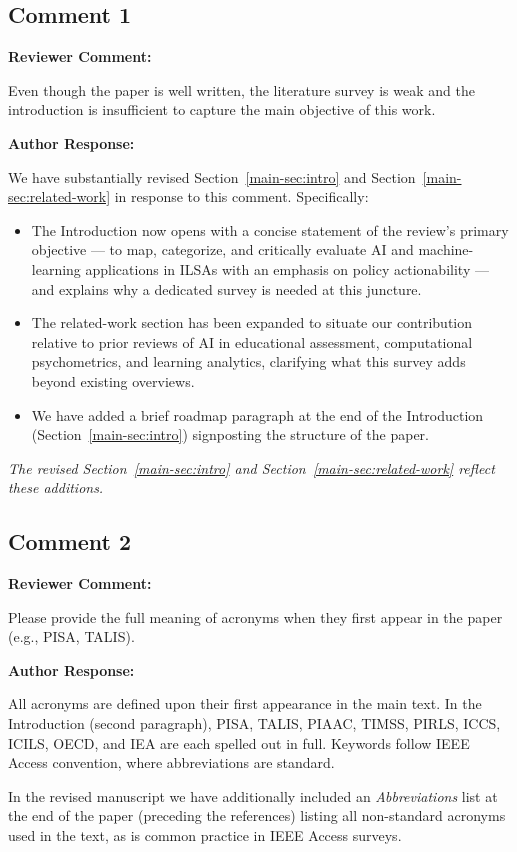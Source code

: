 \documentclass[12pt, a4paper]{article}
\newcommand{\R}[1]{Section~\ref{main-#1}}
\newenvironment{reviewercomment}{%
  \begin{mdframed}[linecolor=reviewercolor, linewidth=1.5pt,
    backgroundcolor=reviewercolor!6, innertopmargin=8pt, innerbottommargin=8pt]
  \color{reviewercolor}\textbf{Reviewer Comment:}\normalcolor\par\smallskip
}{%
  \end{mdframed}\medskip
}
\newenvironment{authorresponse}{%
  \begin{mdframed}[linecolor=authorcolor, linewidth=1pt,
    backgroundcolor=authorcolor!5, innertopmargin=8pt, innerbottommargin=8pt]
  \color{authorcolor}\textbf{Author Response:}\normalcolor\par\smallskip
}{%
  \end{mdframed}\bigskip
}
\newcommand{\changed}[1]{\textcolor{changedcolor}{\textit{#1}}}
\begin{document}
\subsection*{Comment 1}

\begin{reviewercomment}
Even though the paper is well written, the literature survey is weak and
the introduction is insufficient to capture the main objective of this work.
\end{reviewercomment}

\begin{authorresponse}
We have substantially revised \R{sec:intro} and \R{sec:related-work} in
response to this comment. Specifically:
\begin{itemize}[leftmargin=*]
  \item The Introduction now opens with a concise statement of the review's
    primary objective --- to map, categorize, and critically evaluate AI
    and machine-learning applications in ILSAs with an emphasis on policy
    actionability --- and explains why a dedicated survey is needed at
    this juncture.
  \item The related-work section has been expanded to situate our
    contribution relative to prior reviews of AI in educational assessment,
    computational psychometrics, and learning analytics, clarifying what
    this survey adds beyond existing overviews.
  \item We have added a brief roadmap paragraph at the end of the
    Introduction (\R{sec:intro}) signposting the structure of the paper.
\end{itemize}

\changed{The revised \R{sec:intro} and \R{sec:related-work} reflect
these additions.}
\end{authorresponse}

\subsection*{Comment 2}

\begin{reviewercomment}
Please provide the full meaning of acronyms when they first appear in the
paper (e.g., PISA, TALIS).
\end{reviewercomment}

\begin{authorresponse}
All acronyms are defined upon their first appearance in the main text.
In the Introduction (second paragraph), PISA, TALIS, PIAAC, TIMSS, PIRLS,
ICCS, ICILS, OECD, and IEA are each spelled out in full. Keywords follow
IEEE Access convention, where abbreviations are standard.

In the revised manuscript we have additionally included an
\textit{Abbreviations} list at the end of the paper (preceding the
references) listing all non-standard acronyms used in the text, as is
common practice in IEEE Access surveys.
\end{authorresponse}
\end{document}
